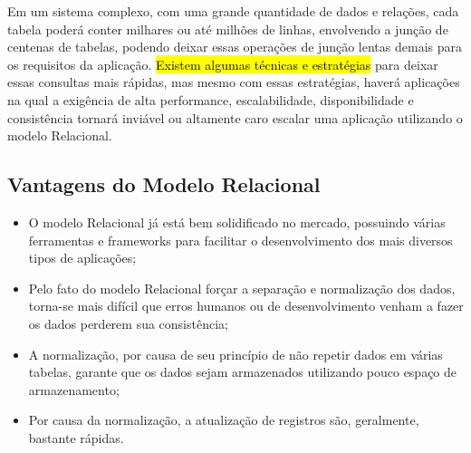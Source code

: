     
Em um sistema complexo, com uma grande quantidade de dados e relações, cada tabela poderá conter milhares ou até milhões de linhas, envolvendo a junção de centenas de tabelas, podendo deixar essas operações de junção lentas demais para os requisitos da aplicação. \hl{Existem algumas técnicas e estratégias} para deixar essas consultas mais rápidas, mas mesmo com essas estratégias, haverá aplicações na qual a exigência de alta performance, escalabilidade, disponibilidade e consistência tornará inviável ou altamente caro escalar uma aplicação utilizando o modelo Relacional.


\subsection{Vantagens do Modelo Relacional}

    
\begin{itemize}
    \item O modelo Relacional já está bem solidificado no mercado, possuindo várias
         ferramentas e frameworks para facilitar o desenvolvimento dos mais diversos tipos
         de aplicações;
        
    \item Pelo fato do modelo Relacional forçar a separação e normalização dos dados,
         torna-se mais difícil que erros humanos ou de desenvolvimento venham a fazer os
         dados perderem sua consistência;
        
        
        
    \item A normalização, por causa de seu princípio de não repetir dados em várias tabelas,
         garante que os dados sejam armazenados utilizando pouco espaço de
         armazenamento;

    \item Por causa da normalização, a atualização de registros são, geralmente, bastante 
         rápidas.
\end{itemize}
    
